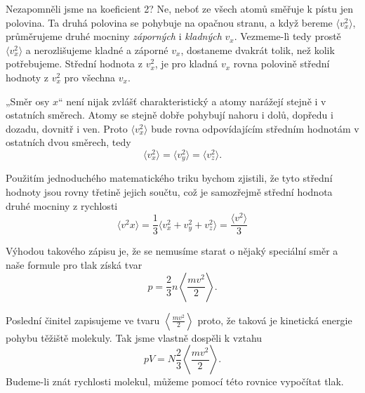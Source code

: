    Nezapomněli jsme na koeficient 2? Ne, neboť ze všech atomů směřuje k pístu jen polovina. Ta druhá
    polovina se pohybuje na opačnou stranu, a když bereme \(\langle v^2_x\rangle\), průměrujeme
    druhé mocniny \emph{záporných} i \emph{kladných} \(v_x\). Vezmeme-lì tedy prostě \(\langle
    v^2_x\rangle\) a nerozlišujeme kladné a záporné \(v_x\), dostaneme dvakrát tolik, než kolik
    potřebujeme. Střední hodnota z \(v_x^2\), je pro kladná \(v_x\) rovna polovině střední hodnoty z
    \(v_x^2\) pro všechna \(v_x\).

    „Směr osy \(x\)“ není nijak zvlášť charakteristický a atomy narážejí stejně i v ostatních
    směrech. Atomy se stejně dobře pohybují nahoru i dolů, dopředu i dozadu, dovnitř i ven. Proto
    \(\langle v^2_x\rangle\) bude rovna odpovídajícím středním hodnotám v ostatních dvou směrech,
    tedy
    \begin{equation}\label{fyz:eq617}
      \langle v^2_x \rangle = \langle v^2_y \rangle = \langle v^2_z\rangle.
    \end{equation}

    Použitím jednoduchého matematického triku bychom zjistili, že tyto střední hodnoty jsou rovny
    třetině jejich součtu, což je samozřejmě střední hodnota druhé mocniny z rychlosti
    \begin{equation}\label{fyz:eq618}
      \langle v^2x\rangle = \frac{1}{3}\langle v^2_x+v^2_y+v^2_z\rangle 
                          = \frac{\langle v^2\rangle}{3}
    \end{equation}

    Výhodou takového zápisu je, že se nemusíme starat o nějaký speciální směr a naše formule pro
    tlak získá tvar
    \begin{equation}\label{fyz:eq619}
      p = \frac{2}{3}n\left\langle\frac{mv^2}{2}\right\rangle.
    \end{equation}

    Poslední činitel zapisujeme ve tvaru \(\left\langle\frac{mv^2}{2}\right\rangle\) proto, že
    taková je kinetická energie pohybu těžiště molekuly. Tak jsme vlastně dospěli k vztahu
    \begin{equation}\label{fyz:eq620}
      pV = N\frac{2}{3}\left\langle\frac{mv^2}{2}\right\rangle.
    \end{equation}
    Budeme-li znát rychlosti molekul, můžeme pomocí této rovnice vypočítat tlak.

